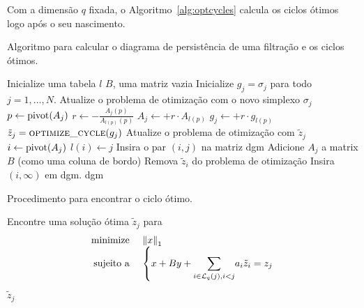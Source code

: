 Com a dimensão $q$ fixada, o Algoritmo~\ref{alg:optcycles} calcula os ciclos ótimos logo após 
o seu nascimento. 

\begin{algoritmo}[htpb!]
    \caption{Algoritmo para calcular o diagrama de persistência de uma filtração e os ciclos ótimos.}
    \label{alg:optcycles}
    \begin{algorithmic}[1]
            \State Inicialize uma tabela $l$
            \State $B$, uma matriz vazia
            \State Inicialize $g_j = \sigma_j$ para todo $j=1,\dots,N$.
                    \State Atualize o problema de otimização com o novo simplexo $\sigma_j$
                \EndIf
                    \State $p \leftarrow \text{pivot}(A_j)$
                    \State $r \leftarrow -\frac{A_j(p)}{A_{l(p)}(p)}$
                    \State $A_j \leftarrow + r \cdot A_{l(p)}$
                    \State $g_j \leftarrow + r \cdot g_{l(p)}$
                \EndWhile
                    \State $\tilde{z}_j = \textsc{optimize\_cycle}(g_j)$
                    \State Atualize o problema de otimização com $\tilde{z}_j$
                \EndIf
                    \State $i \leftarrow \text{pivot}(A_j)$
                    \State $l(i) \leftarrow j$ 
                    \State Insira o par $(i,j)$ na matriz dgm
                        \State Adicione $A_j$ a matrix $B$ (como uma coluna de bordo)
                        \State Remova $\tilde{z}_i$ do problema de otimização
                    \EndIf
                \EndIf
            \EndFor
                \State Insira $(i, \infty)$ em dgm. 
            \EndFor
            \State \Return dgm     
        \EndProcedure 
    \end{algorithmic}
\end{algoritmo}

\begin{algoritmo}
    \caption{Procedimento para encontrar o ciclo ótimo.}
    \label{alg:optimize}
    \begin{algorithmic}[1]
            \State Encontre uma solução ótima $\tilde{z}_j$ para
            \begin{equation}\label{eq:optimize}
                \begin{array}{rl}
                    \text{minimize } & \norm{x}_1 \\
                    \text{sujeito a } & 
                    \left\{x + By + \mathlarger{\sum}_{i \in \mathcal{L}_q(j), i < j} a_i \tilde{z}_i = z_j\right.
                \end{array}
            \end{equation}
            \State \Return $\tilde{z}_j$
        \EndProcedure
    \end{algorithmic}
\end{algoritmo}

